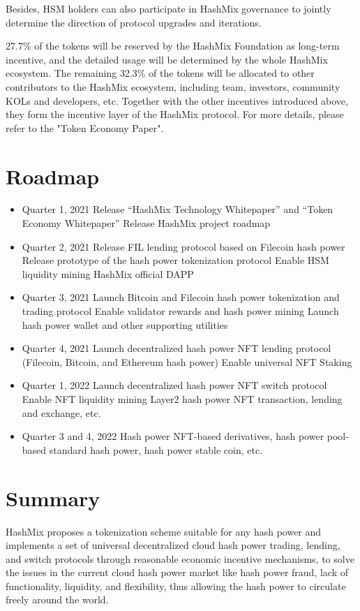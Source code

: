\documentclass[]{template/llncs}
\begin{document}
Besides, HSM holders can also participate in HashMix governance to jointly determine the direction of protocol upgrades and iterations.

27.7\% of the tokens will be reserved by the HashMix Foundation as long-term incentive, and the detailed usage will be determined by the whole HashMix ecosystem. 
The remaining 32.3\% of the tokens will be allocated to other contributors to the HashMix ecosystem, including team, investors, community KOLs and developers, etc. Together with the other incentives introduced above, they form the incentive layer of the HashMix protocol. For more details, please refer to the "Token Economy Paper".

\section{Roadmap}

\begin{itemize}
	\item Quarter 1, 2021
	\subitem Release “HashMix Technology Whitepaper” and “Token Economy Whitepaper” 
	\subitem Release HashMix project roadmap 

	\item Quarter 2, 2021
	\subitem Release FIL lending protocol based on Filecoin hash power 
  	\subitem Release prototype of the hash power tokenization protocol 
  	\subitem Enable HSM liquidity mining
 	\subitem HashMix official DAPP
 	
	\item Quarter 3, 2021
  	\subitem Launch Bitcoin and Filecoin hash power tokenization and trading protocol 
	\subitem Enable validator rewards and hash power mining 
  	\subitem Launch hash power wallet and other supporting utilities 
	\item Quarter 4, 2021
  	\subitem Launch decentralized hash power NFT lending protocol (Filecoin, Bitcoin, and Ethereum hash power)
	\subitem Enable universal NFT Staking
	\item Quarter 1, 2022
	\subitem Launch decentralized hash power NFT switch protocol
	\subitem Enable NFT liquidity mining
	\subitem Layer2 hash power NFT transaction, lending and exchange, etc.
	\item Quarter 3 and 4, 2022
	\subitem Hash power NFT-based derivatives, hash power pool-based standard hash power, hash power stable coin, etc. 

\end{itemize}

\section{Summary}

HashMix proposes a tokenization scheme suitable for any hash power and implements a set of universal decentralized cloud hash power trading, lending, and switch protocols through reasonable economic incentive mechanisms, to solve the issues in the current cloud hash power market like hash power fraud, lack of functionality, liquidity, and flexibility, thus allowing the hash power to circulate freely around the world.
\end{document}
